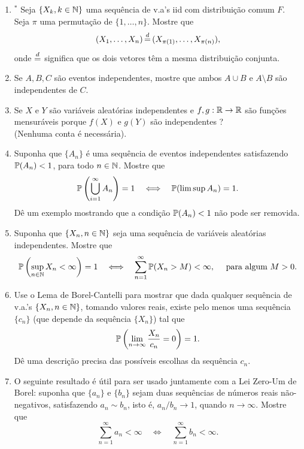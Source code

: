 \begin{enumerate}[leftmargin=*]
		
\item 
$^*$ Seja $\{X_k,k\in\N\}$ uma sequência de v.a's iid com distribuição
comum $F$. Seja $\pi$ uma permutação de $\{1,\ldots,n\}$. 
Mostre que 
	\[
		(X_1,\ldots,X_n) 
		\,{\buildrel d \over =}\, 
		(X_{\pi(1)},\ldots,X_{\pi(n)}),
	\]
onde ${\buildrel d \over =}$ significa que os dois vetores
têm a mesma distribuição conjunta. 



\item 
Se $A,B,C$ são eventos independentes, mostre que 
ambos $A\cup B$ e $A\setminus B$ são independentes de 
$C$.



\item Se $X$ e $Y$ são variáveis aleatórias independentes
e $f,g:\R\to\R$ são funções mensuráveis porque $f(X)$ e $g(Y)$
são independentes ?
\\
(Nenhuma conta é necessária).




\item
Suponha que $\{A_n\}$ é uma sequência de eventos independentes
satisfazendo $\P(A_n)<1$, para todo $n\in \N$. Mostre que 
	\[
		\P \left( \bigcup_{i=1}^{\infty} A_n \right) = 1
		\quad
		\Longleftrightarrow
		\quad
		\P(\limsup A_n) =1.
	\]
Dê um exemplo mostrando que a condição $\P(A_n)<1$ 
não pode ser removida.


\item 
Suponha que $\{X_n, n\in\N\}$ seja uma sequência de variáveis 
aleatórias independentes. Mostre que 
\[
	\P \left(  \sup_{n\in\N} X_n <\infty  \right)=1
	\quad
	\Longleftrightarrow
	\quad
	\sum_{n=1}^{\infty} \P(X_n>M) <\infty,\quad 
	\text{ para algum}\ M>0.
\]



\item
Use o Lema de Borel-Cantelli para mostrar que dada 
qualquer sequência de v.a.'s $\{X_n, n\in\N\}$, tomando valores 
reais, existe pelo menos uma sequência 
$\{c_n\}$ (que depende da sequência $\{X_n\}$) 
tal que 
	\[
		\P \left( \lim_{n\to\infty} \frac{X_n}{c_n}=0 \right)=1.
	\]
Dê uma descrição precisa das possíveis escolhas da sequência $c_n$.



\item 
O seguinte resultado é útil para ser usado juntamente 
com a Lei Zero-Um de Borel: suponha que $\{a_n\}$ 
e $\{b_n\}$ sejam duas sequências de números reais
não-negativos, satisfazendo $a_n \sim b_n$, 
isto é, $a_n/b_n\to 1$, quando $n\to\infty$.
Mostre que 
	\[	
		\sum_{n=1}^{\infty} a_n <\infty
		\quad
		\Longleftrightarrow
		\quad
		\sum_{n=1}^{\infty} b_n <\infty.
	\]	





\end{enumerate}
